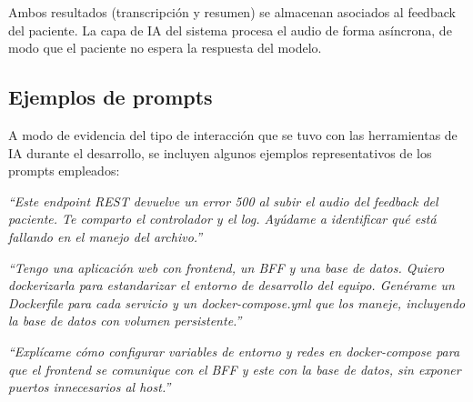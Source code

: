 \noindent Ambos resultados (transcripción y resumen) se almacenan asociados al feedback del paciente. La capa de IA del sistema procesa el audio de forma asíncrona, de modo que el paciente no espera la respuesta del modelo.

\subsection{Ejemplos de prompts}

A modo de evidencia del tipo de interacción que se tuvo con las herramientas de IA durante el desarrollo, se incluyen algunos ejemplos representativos de los prompts empleados:

\begin{infobox}[title=Resolución de errores (bugs)]
\textit{``Este endpoint REST devuelve un error 500 al subir el audio del feedback del paciente. Te comparto el controlador y el log. Ayúdame a identificar qué está fallando en el manejo del archivo.''}
\end{infobox}

\begin{infobox}[title=Dockerización del proyecto]
\textit{``Tengo una aplicación web con frontend, un BFF y una base de datos. Quiero dockerizarla para estandarizar el entorno de desarrollo del equipo. Genérame un Dockerfile para cada servicio y un docker-compose.yml que los maneje, incluyendo la base de datos con volumen persistente.''}
\end{infobox}

\begin{infobox}[title=Dockerización del proyecto]
\textit{``Explícame cómo configurar variables de entorno y redes en docker-compose para que el frontend se comunique con el BFF y este con la base de datos, sin exponer puertos innecesarios al host.''}
\end{infobox}
